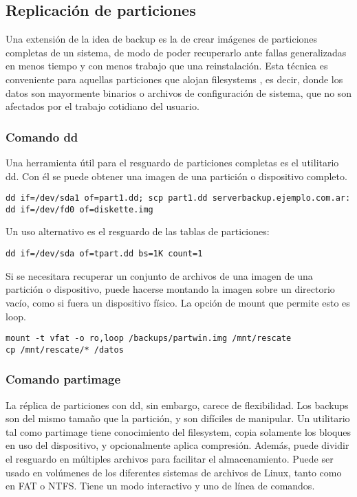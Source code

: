\subsection{Replicación de particiones}

Una extensión de la idea de backup es la de crear imágenes de particiones completas de un sistema, de modo de poder recuperarlo ante fallas generalizadas en menos tiempo y con menos trabajo que una reinstalación. Esta técnica es conveniente para aquellas particiones que alojan filesystems , es decir, donde los datos son mayormente binarios o archivos de configuración de sistema, que no son afectados por el trabajo cotidiano del usuario.

\subsubsection{Comando dd}
Una herramienta útil para el resguardo de particiones completas es el utilitario dd. Con él se puede obtener una imagen de una partición o dispositivo completo. 

\begin{lstlisting}
dd if=/dev/sda1 of=part1.dd; scp part1.dd serverbackup.ejemplo.com.ar:
dd if=/dev/fd0 of=diskette.img
\end{lstlisting}

Un uso alternativo es el resguardo de las tablas de particiones:

\begin{lstlisting}
dd if=/dev/sda of=tpart.dd bs=1K count=1
\end{lstlisting}

Si se necesitara recuperar un conjunto de archivos de una imagen de una partición o dispositivo, puede hacerse montando la imagen sobre un directorio vacío, como si fuera un dispositivo físico. La opción de mount que permite esto es loop.

\begin{lstlisting}
mount -t vfat -o ro,loop /backups/partwin.img /mnt/rescate
cp /mnt/rescate/* /datos
\end{lstlisting}


\subsubsection{Comando partimage}

La réplica de particiones con dd, sin embargo, carece de flexibilidad. Los backups son del mismo tamaño que la partición, y son difíciles de manipular. Un utilitario tal como partimage tiene conocimiento del filesystem, copia solamente los bloques en uso del dispositivo, y opcionalmente aplica compresión. Además, puede dividir el resguardo en múltiples archivos para facilitar el almacenamiento. Puede ser usado en volúmenes de los diferentes sistemas de archivos de Linux, tanto como en FAT o NTFS. Tiene un modo interactivo y uno de línea de comandos.

